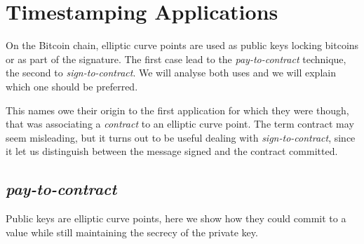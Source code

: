 \section{Timestamping Applications}
On the Bitcoin chain, elliptic curve points are used as public keys locking bitcoins or as part of the signature. The first case lead to the \textit{pay-to-contract} technique, the second to \textit{sign-to-contract}. We will analyse both uses and we will explain which one should be preferred.

This names owe their origin to the first application for which they were though, that was associating a \textit{contract} to an elliptic curve point. 
The term contract may seem misleading, but it turns out to be useful dealing with \textit{sign-to-contract}, since it let us distinguish between the message signed and the contract committed.

\subsection{\textit{pay-to-contract}}
Public keys are elliptic curve points, here we show how they could commit to a value while still maintaining the secrecy of the private key.

